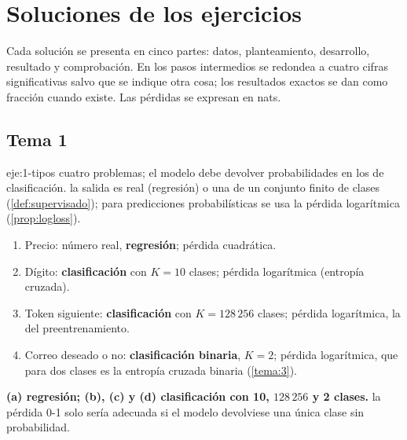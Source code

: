 \chapter{Soluciones de los ejercicios}
\label{ap:soluciones}

Cada solución se presenta en cinco partes: datos, planteamiento, desarrollo, resultado y comprobación. En los pasos intermedios se redondea a cuatro cifras significativas salvo que se indique otra cosa; los resultados exactos se dan como fracción cuando existe. Las pérdidas se expresan en nats.

\section{Tema 1}

\begin{solucion}{eje:1-tipos}
\datos cuatro problemas; el modelo debe devolver probabilidades en los de clasificación.
\planteamiento la salida es real (regresión) o una de un conjunto finito de clases (\cref{def:supervisado}); para predicciones probabilísticas se usa la pérdida logarítmica (\cref{prop:logloss}).
\pasos
\begin{enumerate}[label=(\alph*)]
  \item Precio: número real, \textbf{regresión}; pérdida cuadrática.
  \item Dígito: \textbf{clasificación} con $K=10$ clases; pérdida logarítmica (entropía cruzada).
  \item Token siguiente: \textbf{clasificación} con $K=128\,256$ clases; pérdida logarítmica, la del preentrenamiento.
  \item Correo deseado o no: \textbf{clasificación binaria}, $K=2$; pérdida logarítmica, que para dos clases es la entropía cruzada binaria (\cref{tema:3}).
\end{enumerate}
\resultado \textbf{(a) regresión; (b), (c) y (d) clasificación con 10, $128\,256$ y 2 clases.}
\comprobacion la pérdida 0-1 solo sería adecuada si el modelo devolviese una única clase sin probabilidad.
\end{solucion}

